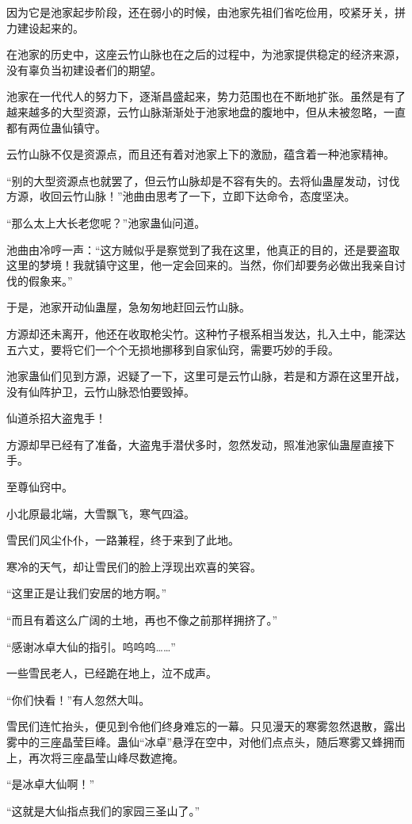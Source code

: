 \begin{this_body}
因为它是池家起步阶段，还在弱小的时候，由池家先祖们省吃俭用，咬紧牙关，拼力建设起来的。

在池家的历史中，这座云竹山脉也在之后的过程中，为池家提供稳定的经济来源，没有辜负当初建设者们的期望。

池家在一代代人的努力下，逐渐昌盛起来，势力范围也在不断地扩张。虽然是有了越来越多的大型资源，云竹山脉渐渐处于池家地盘的腹地中，但从未被忽略，一直都有两位蛊仙镇守。

云竹山脉不仅是资源点，而且还有着对池家上下的激励，蕴含着一种池家精神。

“别的大型资源点也就罢了，但云竹山脉却是不容有失的。去将仙蛊屋发动，讨伐方源，收回云竹山脉！”池曲由思考了一下，立即下达命令，态度坚决。

“那么太上大长老您呢？”池家蛊仙问道。

池曲由冷哼一声：“这方贼似乎是察觉到了我在这里，他真正的目的，还是要盗取这里的梦境！我就镇守这里，他一定会回来的。当然，你们却要务必做出我亲自讨伐的假象来。”

于是，池家开动仙蛊屋，急匆匆地赶回云竹山脉。

方源却还未离开，他还在收取枪尖竹。这种竹子根系相当发达，扎入土中，能深达五六丈，要将它们一个个无损地挪移到自家仙窍，需要巧妙的手段。

池家蛊仙们见到方源，迟疑了一下，这里可是云竹山脉，若是和方源在这里开战，没有仙阵护卫，云竹山脉恐怕要毁掉。

仙道杀招大盗鬼手！

方源却早已经有了准备，大盗鬼手潜伏多时，忽然发动，照准池家仙蛊屋直接下手。

至尊仙窍中。

小北原最北端，大雪飘飞，寒气四溢。

雪民们风尘仆仆，一路兼程，终于来到了此地。

寒冷的天气，却让雪民们的脸上浮现出欢喜的笑容。

“这里正是让我们安居的地方啊。”

“而且有着这么广阔的土地，再也不像之前那样拥挤了。”

“感谢冰卓大仙的指引。呜呜呜……”

一些雪民老人，已经跪在地上，泣不成声。

“你们快看！”有人忽然大叫。

雪民们连忙抬头，便见到令他们终身难忘的一幕。只见漫天的寒雾忽然退散，露出雾中的三座晶莹巨峰。蛊仙“冰卓”悬浮在空中，对他们点点头，随后寒雾又蜂拥而上，再次将三座晶莹山峰尽数遮掩。

“是冰卓大仙啊！”

“这就是大仙指点我们的家园三圣山了。”


\end{this_body}
